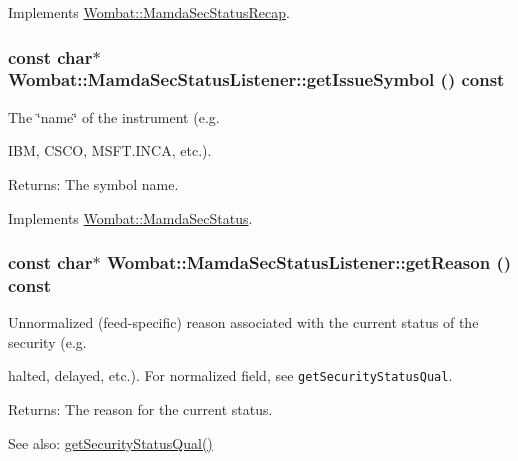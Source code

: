 Implements \hyperlink{classWombat_1_1MamdaSecStatusRecap_8d51b8657752bef75f47ede1edd1ae6b}{Wombat::Mamda\-Sec\-Status\-Recap}.\hypertarget{classWombat_1_1MamdaSecStatusListener_8d05183ac7dac8914259842d6f860a1b}{
\subsubsection[getIssueSymbol]{\setlength{\rightskip}{0pt plus 5cm}const char$\ast$ Wombat::Mamda\-Sec\-Status\-Listener::get\-Issue\-Symbol () const}}
\label{classWombat_1_1MamdaSecStatusListener_8d05183ac7dac8914259842d6f860a1b}


The \char`\"{}name\char`\"{} of the instrument (e.g. 

IBM, CSCO, MSFT.INCA, etc.).

\begin{Desc}
\item[Returns:]The symbol name. \end{Desc}


Implements \hyperlink{classWombat_1_1MamdaSecStatus_40ee188d2918841022327263a2b27fcd}{Wombat::Mamda\-Sec\-Status}.\hypertarget{classWombat_1_1MamdaSecStatusListener_71962c3d0ecd60a689324e68180b4e35}{
\subsubsection[getReason]{\setlength{\rightskip}{0pt plus 5cm}const char$\ast$ Wombat::Mamda\-Sec\-Status\-Listener::get\-Reason () const}}
\label{classWombat_1_1MamdaSecStatusListener_71962c3d0ecd60a689324e68180b4e35}


Unnormalized (feed-specific) reason associated with the current status of the security (e.g. 

halted, delayed, etc.). For normalized field, see {\tt get\-Security\-Status\-Qual}.

\begin{Desc}
\item[Returns:]The reason for the current status. \end{Desc}
\begin{Desc}
\item[See also:]\hyperlink{classWombat_1_1MamdaSecStatusListener_c94de1b4d8e9377a219ce488fa7ef16c}{get\-Security\-Status\-Qual()} \end{Desc}


